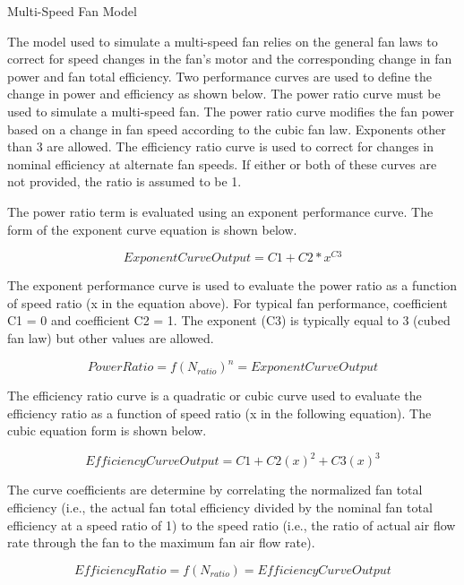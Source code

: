 Multi-Speed Fan Model

The model used to simulate a multi-speed fan relies on the general fan laws to correct for speed changes in the fan's motor and the corresponding change in fan power and fan total efficiency. Two performance curves are used to define the change in power and efficiency as shown below. The power ratio curve must be used to simulate a multi-speed fan. The power ratio curve modifies the fan power based on a change in fan speed according to the cubic fan law. Exponents other than 3 are allowed. The efficiency ratio curve is used to correct for changes in nominal efficiency at alternate fan speeds. If either or both of these curves are not provided, the ratio is assumed to be 1.

The power ratio term is evaluated using an exponent performance curve. The form of the exponent curve equation is shown below.

\begin{equation}
ExponentCurveOutput = C1 + C2*{x^{C3}}
\end{equation}

The exponent performance curve is used to evaluate the power ratio as a function of speed ratio (x in the equation above). For typical fan performance, coefficient C1 = 0 and coefficient C2 = 1. The exponent (C3) is typically equal to 3 (cubed fan law) but other values are allowed.

\begin{equation}
PowerRatio = f{\left( {{N_{ratio}}} \right)^n} = ExponentCurveOutput
\end{equation}

The efficiency ratio curve is a quadratic or cubic curve used to evaluate the efficiency ratio as a function of speed ratio (x in the following equation). The cubic equation form is shown below.

\begin{equation}
EfficiencyCurveOutput = C1 + C2{\left( x \right)^2} + C3{\left( x \right)^3}
\end{equation}

The curve coefficients are determine by correlating the normalized fan total efficiency (i.e., the actual fan total efficiency divided by the nominal fan total efficiency at a speed ratio of 1) to the speed ratio (i.e., the ratio of actual air flow rate through the fan to the maximum fan air flow rate).

\begin{equation}
EfficiencyRatio = f\left( {{N_{ratio}}} \right) = EfficiencyCurveOutput
\end{equation}

